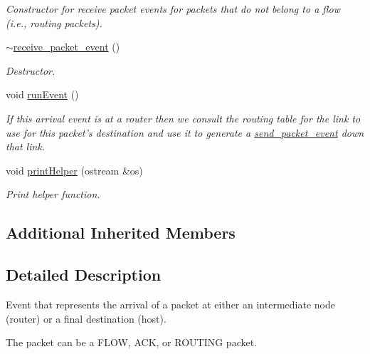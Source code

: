 \begin{DoxyCompactItemize}
\begin{DoxyCompactList}\small\item\em Constructor for receive packet events for packets that do not belong to a flow (i.\-e., routing packets). \end{DoxyCompactList}\item 
\hyperlink{classreceive__packet__event_a5c41daa5c0cd069eb069b1a9cc450c65}{$\sim$receive\-\_\-packet\-\_\-event} ()
\begin{DoxyCompactList}\small\item\em Destructor. \end{DoxyCompactList}\item 
void \hyperlink{classreceive__packet__event_ae7c0b0f1defa3e225373bea73f98b2ba}{run\-Event} ()
\begin{DoxyCompactList}\small\item\em If this arrival event is at a router then we consult the routing table for the link to use for this packet's destination and use it to generate a \hyperlink{classsend__packet__event}{send\-\_\-packet\-\_\-event} down that link. \end{DoxyCompactList}\item 
void \hyperlink{classreceive__packet__event_a0da19ff9fc6f51c9599b095e064ee8ce}{print\-Helper} (ostream \&os)
\begin{DoxyCompactList}\small\item\em Print helper function. \end{DoxyCompactList}\end{DoxyCompactItemize}
\subsection*{Additional Inherited Members}


\subsection{Detailed Description}
Event that represents the arrival of a packet at either an intermediate node (router) or a final destination (host). 

The packet can be a F\-L\-O\-W, A\-C\-K, or R\-O\-U\-T\-I\-N\-G packet. 

